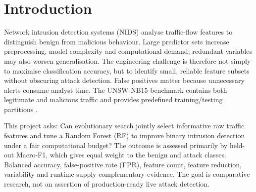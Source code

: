 \documentclass[10pt,a4paper,twocolumn]{extarticle}
\date{17 November 2026}
\begin{document}
\begin{abstract}
Network intrusion detection must balance attack recognition against unnecessary features and false alerts. I compared four evolutionary optimisers (GA, BPSO, continuous-position PSO and NSGA-II) for binary UNSW-NB15 detection, first selecting features alone and then jointly tuning four Random Forest hyperparameters. Each method used five matched random seeds and 300 unique fitness evaluations per seed. Joint PSO achieved the best mean test Macro-F1 (0.8814), using 11.4 of 42 raw predictors (72.9\% reduction), although small-sample statistics and dataset limitations prevent claims of operational superiority.
\end{abstract}
\section{Introduction}
Network intrusion detection systems (NIDS) analyse traffic-flow features to distinguish benign from malicious behaviour. Large predictor sets increase preprocessing, model complexity and computational demand; redundant variables may also worsen generalisation. The engineering challenge is therefore not simply to maximise classification accuracy, but to identify small, reliable feature subsets without obscuring attack detection. False positives matter because unnecessary alerts consume analyst time. The UNSW-NB15 benchmark contains both legitimate and malicious traffic and provides predefined training/testing partitions \parencite{moustafa2015}.

This project asks: Can evolutionary search jointly select informative raw traffic features and tune a Random Forest (RF) to improve binary intrusion detection under a fair computational budget? The outcome is assessed primarily by held-out Macro-F1, which gives equal weight to the benign and attack classes. Balanced accuracy, false-positive rate (FPR), feature count, feature reduction, variability and runtime supply complementary evidence. The goal is comparative research, not an assertion of production-ready live attack detection.
\end{document}
